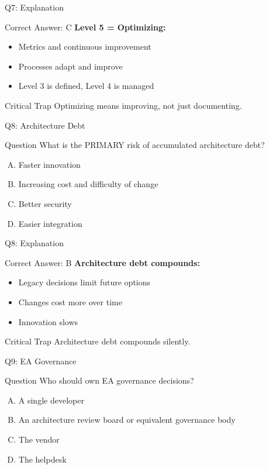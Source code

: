 \documentclass{beamer}
\begin{document}
	\begin{frame}{Q7: Explanation}
		\begin{block}{Correct Answer: C}
			\textbf{Level 5 = Optimizing:}
			\begin{itemize}
				\item Metrics and continuous improvement
				\item Processes adapt and improve
				\item Level 3 is defined, Level 4 is managed
			\end{itemize}
		\end{block}
		\begin{alertblock}{Critical Trap}
			Optimizing means improving, not just documenting.
		\end{alertblock}
	\end{frame}
	
	\begin{frame}{Q8: Architecture Debt}
		\begin{block}{Question}
			What is the PRIMARY risk of accumulated architecture debt?
		\end{block}
		\begin{enumerate}[(A)]
			\item Faster innovation
			\item Increasing cost and difficulty of change
			\item Better security
			\item Easier integration
		\end{enumerate}
	\end{frame}
	
	\begin{frame}{Q8: Explanation}
		\begin{block}{Correct Answer: B}
			\textbf{Architecture debt compounds:}
			\begin{itemize}
				\item Legacy decisions limit future options
				\item Changes cost more over time
				\item Innovation slows
			\end{itemize}
		\end{block}
		\begin{alertblock}{Critical Trap}
			Architecture debt compounds silently.
		\end{alertblock}
	\end{frame}
	
	\begin{frame}{Q9: EA Governance}
		\begin{block}{Question}
			Who should own EA governance decisions?
		\end{block}
		\begin{enumerate}[(A)]
			\item A single developer
			\item An architecture review board or equivalent governance body
			\item The vendor
			\item The helpdesk
		\end{enumerate}
	\end{frame}
	
\end{document}
